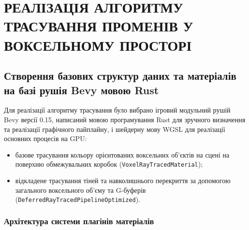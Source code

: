 \chapter{РЕАЛІЗАЦІЯ АЛГОРИТМУ ТРАСУВАННЯ ПРОМЕНІВ У ВОКСЕЛЬНОМУ ПРОСТОРІ}

\section{Створення базових структур даних та матеріалів на базі рушія Bevy мовою Rust}

Для реалізації алгоритму трасування було вибрано ігровий модульний рушій Bevy версії 0.15, написаний мовою програмування Rust для зручного визначення та реалізації графічного пайплайну, і шейдерну мову WGSL для реалізації основних процесів на GPU:
\begin{itemize}[itemsep=0pt, topsep=0pt, label=$\diamond$]
    \item базове трасування кольору орієнтованих воксельних об'єктів на сцені на поверхню обмежувальних коробок (\texttt{VoxelRayTracedMaterial});
    \item відкладене трасування тіней та навколишнього перекриття за допомогою загального воксельного об'єму та G-буферів (\texttt{DeferredRayTraced\-PipelineOptimized}).
\end{itemize}

\subsection{Архітектура системи плагінів матеріалів}

